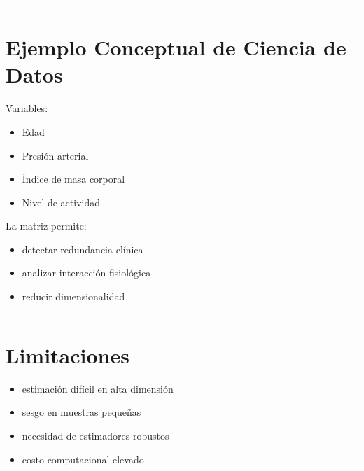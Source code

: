 \documentclass[letterpaper,10pt,english]{jupyterBook}
\begin{document}
\bigskip\hrule\bigskip



\section{Ejemplo Conceptual de Ciencia de Datos}
\label{\detokenize{03_multivariate_models/mi_matrix:ejemplo-conceptual-de-ciencia-de-datos}}
\sphinxAtStartPar
Variables:
\begin{itemize}
\item {} 
\sphinxAtStartPar
Edad

\item {} 
\sphinxAtStartPar
Presión arterial

\item {} 
\sphinxAtStartPar
Índice de masa corporal

\item {} 
\sphinxAtStartPar
Nivel de actividad

\end{itemize}

\sphinxAtStartPar
La matriz permite:
\begin{itemize}
\item {} 
\sphinxAtStartPar
detectar redundancia clínica

\item {} 
\sphinxAtStartPar
analizar interacción fisiológica

\item {} 
\sphinxAtStartPar
reducir dimensionalidad

\end{itemize}


\bigskip\hrule\bigskip



\section{Limitaciones}
\label{\detokenize{03_multivariate_models/mi_matrix:limitaciones}}\begin{itemize}
\item {} 
\sphinxAtStartPar
estimación difícil en alta dimensión

\item {} 
\sphinxAtStartPar
sesgo en muestras pequeñas

\item {} 
\sphinxAtStartPar
necesidad de estimadores robustos

\item {} 
\sphinxAtStartPar
costo computacional elevado

\end{itemize}
\end{document}
